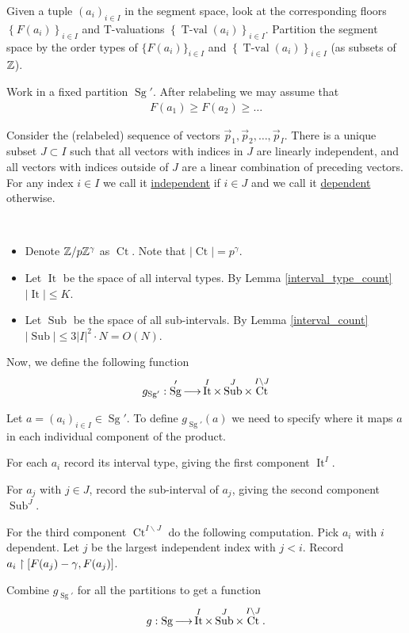 \documentclass{amsart}
\newcommand{\curly}[1]{\left\{#1\right\}}
\DeclareMathOperator{\Sg}{Sg}
\DeclareMathOperator{\It}{It}
\DeclareMathOperator{\Sub}{Sub}
\DeclareMathOperator{\Ct}{Ct}
\DeclareMathOperator{\tval}{T-val}
\newcommand{\defn}{\underline}
\begin{document}
Given a tuple $(a_i)_{i\in I}$ in the segment space,
look at the corresponding floors $\curly{F(a_i)}_{i\in I}$ and T-valuations $\curly{\tval(a_i)}_{i\in I}$.
Partition the segment space by the order types of $\{F(a_i)\}_{i\in I}$ and $\curly{\tval(a_i)}_{i\in I}$ (as subsets of $\mathbb{Z}$).

Work in a fixed partition $\Sg'$.
After relabeling we may assume that
\begin{align*}
  F(a_1) \geq F(a_2) \geq \ldots 
\end{align*}

Consider the (relabeled) sequence of vectors $\vec p_1, \vec p_2, \ldots, \vec p_I$.
There is a unique subset $J \subset I$ such that all vectors with indices in $J$ are linearly independent,
and all vectors with indices outside of $J$ are a linear combination of preceding vectors.
For any index $i \in I$ we call it \defn{independent} if $i \in J$ and we call it \defn{dependent} otherwise.


\begin{Definition} \ 
  \begin{itemize}
  \item Denote $\mathbb{Z}/p\mathbb{Z}^\gamma$ as \defn{$\Ct$}.
    Note that $|\Ct| = p^\gamma$.
  \item Let \defn{$\It$} be the space of all interval types.
    By Lemma \ref{interval_type_count} $|\It| \leq K$.
  \item Let \defn{$\Sub$} be the space of all sub-intervals.
    By Lemma \ref{interval_count} $|\Sub| \leq 3 |I|^2 \cdot N = O(N)$.
  \end{itemize}
\end{Definition}

\begin{Definition}
  Now, we define the following function
  \begin{align*}
    g_{\Sg'}: \Sg' \arr \It^I \times \Sub^J \times \Ct^{I \backslash J}
  \end{align*}

  Let $a = (a_i)_{i\in I} \in \Sg'$.
  To define $g_{\Sg'}(a)$ we need to specify where it maps $a$ in each individual component of the product.

  For each $a_i$ record its interval type, giving the first component $\It^I$.

  For $a_j$ with $j \in J$, record the sub-interval of $a_j$, giving the second component $\Sub^J$.

  For the third component $\Ct^{I \backslash J}$ do the following computation.
  Pick $a_i$ with $i$ dependent.
  Let $j$ be the largest independent index with $j < i$.
  Record $a_i \upharpoonright [F(a_j) - \gamma, F(a_j)]$.

  Combine $g_{\Sg'}$ for all the partitions to get a function 
  \begin{align*}
    g: \Sg \arr \It^I \times \Sub^J \times \Ct^{I \backslash J}.  
  \end{align*}
\end{Definition}
\end{document}
